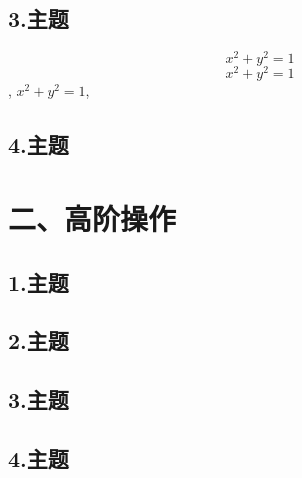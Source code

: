 \documentclass[12pt,aspectratio=169]{beamer}
\begin{document}
\subsection{3.主题}

\begin{frame}
    \[ x^2+y^2=1 \]
    $$ x^2+y^2=1 $$, $ x^2+y^2=1 $, 
\end{frame}

\subsection{4.主题}

\section{二、高阶操作}
\subsection{1.主题}
\subsection{2.主题}
\subsection{3.主题}
\subsection{4.主题}
\end{document}
